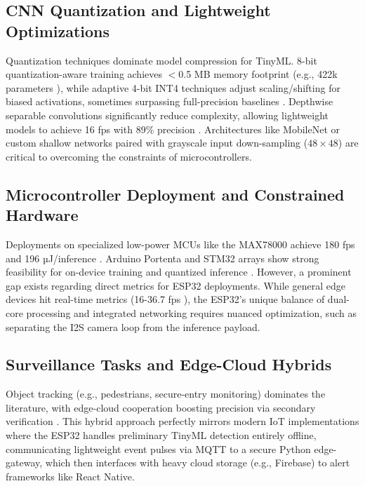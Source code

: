 \documentclass[12pt, a4paper]{article}
\begin{document}
\subsection{CNN Quantization and Lightweight Optimizations}
Quantization techniques dominate model compression for TinyML. 8-bit quantization-aware training achieves $<$0.5 MB memory footprint (e.g., 422k parameters \cite{moosmann2023}), while adaptive 4-bit INT4 techniques adjust scaling/shifting for biased activations, sometimes surpassing full-precision baselines \cite{chin2022}. Depthwise separable convolutions significantly reduce complexity, allowing lightweight models to achieve 16 fps with 89\% precision \cite{zhao2020}. Architectures like MobileNet or custom shallow networks paired with grayscale input down-sampling ($48\times 48$) are critical to overcoming the constraints of microcontrollers.

\subsection{Microcontroller Deployment and Constrained Hardware}
Deployments on specialized low-power MCUs like the MAX78000 achieve 180 fps and 196 µJ/inference \cite{moosmann2023}. Arduino Portenta and STM32 arrays show strong feasibility for on-device training and quantized inference \cite{aatab2023, moosmann2023}. However, a prominent gap exists regarding direct metrics for ESP32 deployments. While general edge devices hit real-time metrics (16-36.7 fps \cite{zhao2020, xu2021}), the ESP32's unique balance of dual-core processing and integrated networking requires nuanced optimization, such as separating the I2S camera loop from the inference payload.

\subsection{Surveillance Tasks and Edge-Cloud Hybrids}
Object tracking (e.g., pedestrians, secure-entry monitoring) dominates the literature, with edge-cloud cooperation boosting precision via secondary verification \cite{xu2021, lyu2022}. This hybrid approach perfectly mirrors modern IoT implementations where the ESP32 handles preliminary TinyML detection entirely offline, communicating lightweight event pulses via MQTT to a secure Python edge-gateway, which then interfaces with heavy cloud storage (e.g., Firebase) to alert frameworks like React Native.
\end{document}
